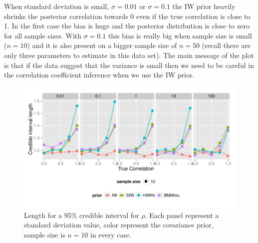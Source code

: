 \documentclass[a4paper]{article}
\begin{document}
When standard deviation is small, $\sigma=0.01$ or $\sigma=0.1$ the IW prior heavily shrinks the posterior correlation towards 0 even if the true correlation is close to 1. In the first case the bias is huge and the posterior distribution is close to zero for all sample sizes.  With $\sigma=0.1$ this bias is really big when sample size is small ($n=10$) and it is also present on a bigger sample size of $n=50$ (recall there are only three parameters to estimate in this data set). The main message of the plot is that if the data suggest that the variance is small then we need to be careful in the correlation coefficient inference when we use the IW prior. 
\begin{figure}[htbp]
   \centering
   \includegraphics[width=\textwidth]{cilength} %
    \vspace{-.5in}
   \caption{Length for a 95\% credible interval for $\rho$. Each panel represent a standard deviation value,  color represent the covariance prior, sample size is $n=10$ in every case.  \label{cilength} }
\end{figure}
\end{document}
